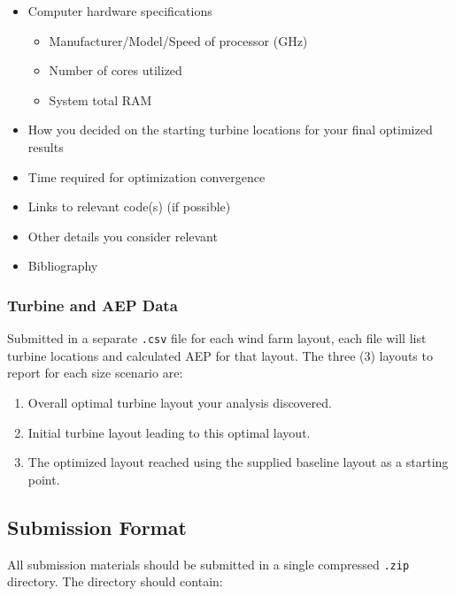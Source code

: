 \documentclass[12pt]{article}
\begin{document}
\begin{itemize}
\begin{itemize}
                \end{itemize}
                \item Computer hardware specifications
                \begin{itemize}
                    \item Manufacturer/Model/Speed of processor (GHz)
                    \item Number of cores utilized
                    \item System total RAM
                    \end{itemize}
                \item How you decided on the starting turbine locations for your final optimized results
                \item Time required for optimization convergence
                \item Links to relevant code(s) (if possible)
                \item Other details you consider relevant
                \item Bibliography
            \end{itemize}
    
    \subsubsection{Turbine and AEP Data}
        Submitted in a separate \texttt{.csv} file for each wind farm layout, each file will list turbine locations and calculated AEP for that layout. The three (3) layouts to report for each size scenario are:
    	
    	\begin{enumerate}
    	    \item Overall optimal turbine layout your analysis discovered.
    	    \item Initial turbine layout leading to this optimal layout.
    	    \item The optimized layout reached using the supplied baseline layout as a starting point.
    	\end{enumerate}

\subsection{Submission Format}
    All submission materials should be submitted in a single compressed \texttt{.zip} directory. The directory should contain:
    
\end{document}
